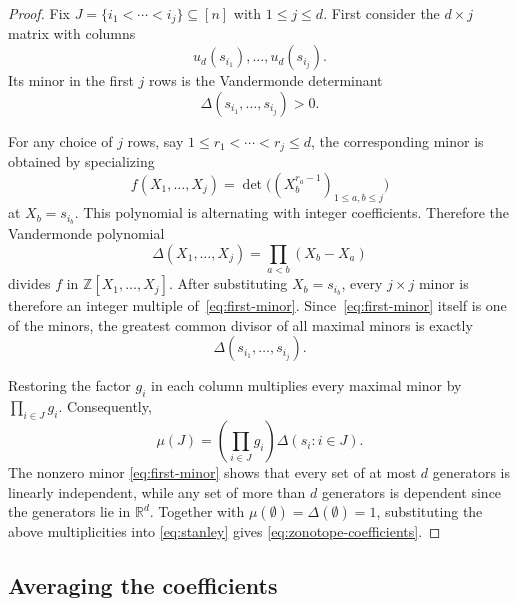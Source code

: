 \documentclass[a4paper,reqno,11pt,oneside]{amsart}
\newcommand{\ZZ}{\mathbb{Z}}
\newcommand{\RR}{\mathbb{R}}
\theoremstyle{definition}
\theoremstyle{remark}
\begin{document}
\begin{proof}
Fix $J=\{i_1<\cdots<i_j\}\subseteq[n]$ with $1\le j\le d$. First consider the $d\times j$ matrix with columns
\[
u_d(s_{i_1}),\ldots,u_d(s_{i_j}).
\]
Its minor in the first $j$ rows is the Vandermonde determinant
\begin{equation}\label{eq:first-minor}
    \Delta(s_{i_1},\ldots,s_{i_j})>0.
\end{equation}

For any choice of $j$ rows, say $1\le r_1<\cdots<r_j\le d$, the corresponding minor is obtained by specializing
\[
f(X_1,\ldots,X_j)=\det\bigl((X_b^{r_a-1})_{1\le a,b\le j}\bigr)
\]
at $X_b = s_{i_b}$. This polynomial is alternating with integer coefficients. Therefore the Vandermonde polynomial
\[
\Delta(X_1,\ldots,X_j)=\prod_{a<b}(X_b-X_a)
\]
divides $f$ in $\ZZ[X_1,\ldots,X_j]$. After substituting $X_b=s_{i_b}$, every $j\times j$ minor is therefore an integer multiple of~\eqref{eq:first-minor}. Since~\eqref{eq:first-minor} itself is one of the minors, the greatest common divisor of all maximal minors is exactly
\[
\Delta(s_{i_1},\ldots,s_{i_j}).
\]

Restoring the factor $g_i$ in each column multiplies every maximal minor by $\prod_{i\in J}g_i$. Consequently,
\[
\mu(J)=\left(\prod_{i\in J}g_i\right)\Delta(s_i:i\in J).
\]
The nonzero minor \eqref{eq:first-minor} shows that every set of at most $d$ generators is linearly independent, while any set of more than $d$ generators is dependent since the generators lie in $\RR^d$. Together with $\mu(\emptyset)=\Delta(\emptyset)=1$, substituting the above multiplicities into \eqref{eq:stanley} gives \eqref{eq:zonotope-coefficients}.
\end{proof}

\subsection{Averaging the coefficients}
\end{document}
